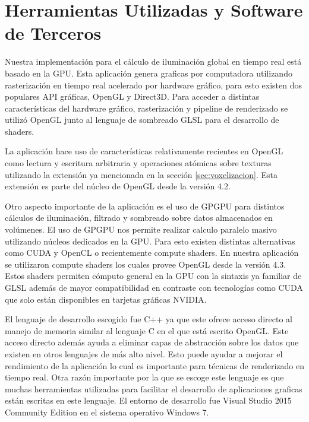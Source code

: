 \section{Herramientas Utilizadas y Software de Terceros}
Nuestra implementación para el cálculo de iluminación global en tiempo real está basado en la \ac{GPU}. Esta aplicación genera graficas por computadora utilizando rasterización en tiempo real acelerado por hardware gráfico, para esto existen dos populares API gráficas, OpenGL y Direct3D. Para acceder a distintas características del hardware gráfico, rasterización y pipeline de renderizado se utilizó OpenGL junto al lenguaje de sombreado GLSL para el desarrollo de shaders. 

La aplicación hace uso de características relativamente recientes en OpenGL como lectura y escritura arbitraria y operaciones atómicas sobre texturas utilizando la extensión ya mencionada en la sección \ref{sec:voxelizacion}. Esta extensión es parte del núcleo de OpenGL desde la versión 4.2. 

Otro aspecto importante de la aplicación es el uso de \ac{GPGPU} para distintos cálculos de iluminación, filtrado y sombreado sobre datos almacenados en volúmenes. El uso de \ac{GPGPU} nos permite realizar calculo paralelo masivo utilizando núcleos dedicados en la \ac{GPU}. Para esto existen distintas alternativas como CUDA y OpenCL o recientemente compute shaders. En nuestra aplicación se utilizaron compute shaders los cuales provee OpenGL desde la versión 4.3. Estos shaders permiten cómputo general en la GPU con la sintaxis ya familiar de GLSL además de mayor compatibilidad en contraste con tecnologías como CUDA que solo están disponibles en tarjetas gráficas NVIDIA.

El lenguaje de desarrollo escogido fue C++ ya que este ofrece acceso directo al manejo de memoria similar al lenguaje C en el que está escrito OpenGL. Este acceso directo además ayuda a eliminar capas de abstracción sobre los datos que existen en otros lenguajes de más alto nivel. Esto puede ayudar a mejorar el rendimiento de la aplicación lo cual es importante para técnicas de renderizado en tiempo real. Otra razón importante por la que se escoge este lenguaje es que muchas herramientas utilizadas para facilitar el desarrollo de aplicaciones graficas están escritas en este lenguaje. El entorno de desarrollo fue Visual Studio 2015 Community Edition en el sistema operativo Windows 7.

